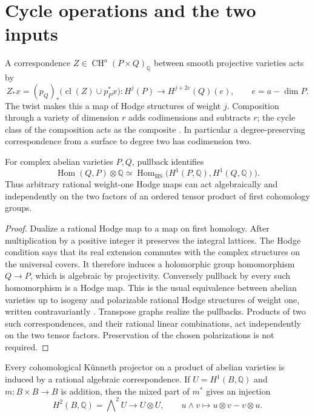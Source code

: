 \section{Cycle operations and the two inputs}\label{sec:cycles}

A correspondence $Z\in\operatorname{CH}^a(P\times Q)_{\mathbb Q}$ between smooth projective varieties acts by
\begin{equation}\label{eq:degree-convention}
 Z_*x=(p_Q)_*\bigl(\operatorname{cl}(Z)\cup p_P^*x\bigr):
 H^j(P)\longrightarrow H^{j+2e}(Q)(e),\qquad e=a-\dim P.
\end{equation}
The twist makes this a map of Hodge structures of weight $j$. Composition through a variety of dimension $r$ adds codimensions and subtracts $r$; the cycle class of the composition acts as the composite \cite{Fulton}. In particular a degree-preserving correspondence from a surface to degree two has codimension two.

\begin{lemma}\label{cyc:h1}
For complex abelian varieties $P,Q$, pullback identifies
\[
 \operatorname{Hom}(Q,P)\otimes\mathbb Q
 \simeq
 \operatorname{Hom}_{\mathrm{HS}}\bigl(H^1(P,\mathbb Q),H^1(Q,\mathbb Q)\bigr).
\]
Thus arbitrary rational weight-one Hodge maps can act algebraically and independently on the two factors of an ordered tensor product of first cohomology groups.
\end{lemma}

\begin{proof}
Dualize a rational Hodge map to a map on first homology. After multiplication by a positive integer it preserves the integral lattices. The Hodge condition says that its real extension commutes with the complex structures on the universal covers. It therefore induces a holomorphic group homomorphism $Q\to P$, which is algebraic by projectivity. Conversely pullback by every such homomorphism is a Hodge map. This is the usual equivalence between abelian varieties up to isogeny and polarizable rational Hodge structures of weight one, written contravariantly \cite[Theorem 6.8 and Corollary 6.9]{Milne}. Transpose graphs realize the pullbacks. Products of two such correspondences, and their rational linear combinations, act independently on the two tensor factors. Preservation of the chosen polarizations is not required.
\end{proof}

\begin{lemma}\label{cyc:projectors}
Every cohomological K\"unneth projector on a product of abelian varieties is induced by a rational algebraic correspondence. If $U=H^1(B,\mathbb Q)$ and $m:B\times B\to B$ is addition, then the mixed part of $m^*$ gives an injection
\[
 H^2(B,\mathbb Q)=\bigwedge\nolimits^2U\longrightarrow U\otimes U,
 \qquad u\wedge v\longmapsto u\otimes v-v\otimes u.
\]
\end{lemma}

